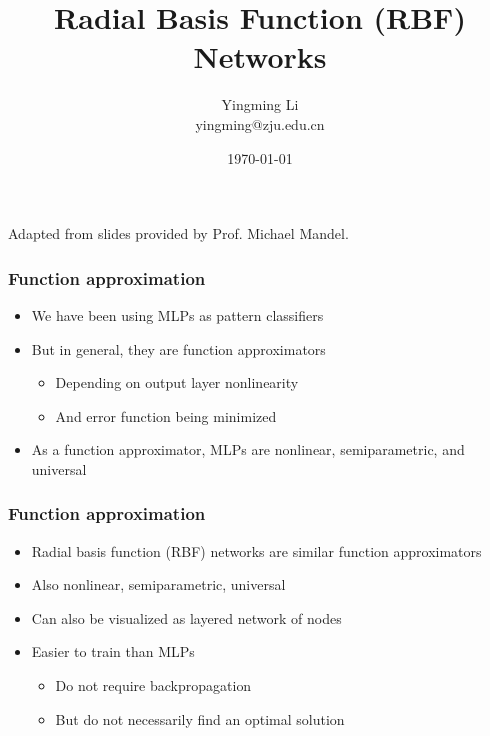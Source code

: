 \documentclass[12pt,notes,mathserif]{beamer}
\title{Radial Basis Function (RBF) Networks}
\author[YingmingLi]{Yingming Li \\ yingming@zju.edu.cn}
\institute[DSERC, ZJU]{Data Science \& Engineering Research Center, ZJU}
\date[\today]{\today}
\begin{document}

\begin{frame}[c]
	\titlepage
	\begin{center}
		Adapted from slides provided by Prof.  Michael Mandel.		
	\end{center}
\end{frame}

\begin{frame}[c]
	\frametitle{Function approximation}
	\begin{itemize}
		\item We have been using MLPs as pattern classifiers
		\item But in general, they are function approximators
		      \begin{itemize}
			      \item Depending on output layer nonlinearity
			      \item And error function being minimized
		      \end{itemize}
		\item As a function approximator, MLPs are nonlinear, semiparametric, and universal
	\end{itemize}
\end{frame}
\begin{frame}[c]
	\frametitle{Function approximation}
	\begin{itemize}
		\item  Radial basis function (RBF) networks are similar function approximators
		\item Also nonlinear, semiparametric, universal
		\item Can also be visualized as layered network of nodes
		\item Easier to train than MLPs
		      \begin{itemize}
			      \item Do not require backpropagation
			      \item But do not necessarily find an optimal solution
		      \end{itemize}
	\end{itemize}
\end{frame}
\end{document}
